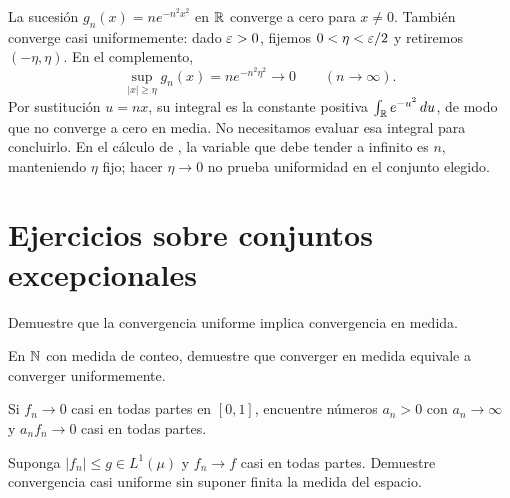 \begin{ejemplo}
La sucesión $g_n(x)=n e^{-n^2x^2}$ en $\mathbb R$ converge a cero para $x\ne0$. También converge casi uniformemente: dado $\varepsilon>0$, fijemos $0<\eta<\varepsilon/2$ y retiremos $(-\eta,\eta)$. En el complemento,
\[\sup_{|x|\ge\eta}g_n(x)=n e^{-n^2\eta^2}\longrightarrow0\qquad(n\to\infty).
\]
Por sustitución $u=nx$, su integral es la constante positiva $\int_\mathbb R e^{-u^2}\,du$, de modo que no converge a cero en media. No necesitamos evaluar esa integral para concluirlo. En el cálculo de \cite{maximenkoConvergencias}, la variable que debe tender a infinito es $n$, manteniendo $\eta$ fijo; hacer $\eta\to0$ no prueba uniformidad en el conjunto elegido.
\end{ejemplo}

\section{Ejercicios sobre conjuntos excepcionales}
\begin{ejercicio}\label{ej:v2-l14-1}
Demuestre que la convergencia uniforme implica convergencia en medida.
\end{ejercicio}

\begin{ejercicio}\label{ej:v2-l14-2}
En $\mathbb N$ con medida de conteo, demuestre que converger en medida equivale a converger uniformemente.
\end{ejercicio}

\begin{ejercicio}\label{ej:v2-l14-3}
Si $f_n\to0$ casi en todas partes en $[0,1]$, encuentre números $a_n>0$ con $a_n\to\infty$ y $a_nf_n\to0$ casi en todas partes.
\end{ejercicio}

\begin{ejercicio}\label{ej:v2-l14-4}
Suponga $|f_n|\le g\in L^1(\mu)$ y $f_n\to f$ casi en todas partes. Demuestre convergencia casi uniforme sin suponer finita la medida del espacio.
\end{ejercicio}


